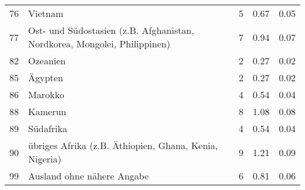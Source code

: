 \begin{longtable}{lXrrr}
        76 & \multicolumn{1}{X}{Vietnam} & %
          \num{5} &
          \num[round-mode=places,round-precision=2]{0.67} &
          \num[round-mode=places,round-precision=2]{0.05} \\

        77 & \multicolumn{1}{X}{Ost- und Südostasien (z.B. Afghanistan, Nordkorea, Mongolei, Philippinen)} & %
          \num{7} &
          \num[round-mode=places,round-precision=2]{0.94} &
          \num[round-mode=places,round-precision=2]{0.07} \\

        82 & \multicolumn{1}{X}{Ozeanien} & %
          \num{2} &
          \num[round-mode=places,round-precision=2]{0.27} &
          \num[round-mode=places,round-precision=2]{0.02} \\

        85 & \multicolumn{1}{X}{Ägypten} & %
          \num{2} &
          \num[round-mode=places,round-precision=2]{0.27} &
          \num[round-mode=places,round-precision=2]{0.02} \\

        86 & \multicolumn{1}{X}{Marokko} & %
          \num{4} &
          \num[round-mode=places,round-precision=2]{0.54} &
          \num[round-mode=places,round-precision=2]{0.04} \\

        88 & \multicolumn{1}{X}{Kamerun} & %
          \num{8} &
          \num[round-mode=places,round-precision=2]{1.08} &
          \num[round-mode=places,round-precision=2]{0.08} \\

        89 & \multicolumn{1}{X}{Südafrika} & %
          \num{4} &
          \num[round-mode=places,round-precision=2]{0.54} &
          \num[round-mode=places,round-precision=2]{0.04} \\

        90 & \multicolumn{1}{X}{übriges Afrika (z.B. Äthiopien, Ghana, Kenia, Nigeria)} & %
          \num{9} &
          \num[round-mode=places,round-precision=2]{1.21} &
          \num[round-mode=places,round-precision=2]{0.09} \\

        99 & \multicolumn{1}{X}{Ausland ohne nähere Angabe} & %
          \num{6} &
          \num[round-mode=places,round-precision=2]{0.81} &
          \num[round-mode=places,round-precision=2]{0.06} \\


\end{longtable}
